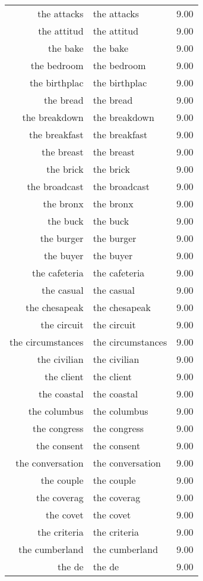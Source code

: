 \begin{table}[ht]
\begin{tabular}{rlr}
  the attacks & the attacks & 9.00 \\ 
  the attitud & the attitud & 9.00 \\ 
  the bake & the bake & 9.00 \\ 
  the bedroom & the bedroom & 9.00 \\ 
  the birthplac & the birthplac & 9.00 \\ 
  the bread & the bread & 9.00 \\ 
  the breakdown & the breakdown & 9.00 \\ 
  the breakfast & the breakfast & 9.00 \\ 
  the breast & the breast & 9.00 \\ 
  the brick & the brick & 9.00 \\ 
  the broadcast & the broadcast & 9.00 \\ 
  the bronx & the bronx & 9.00 \\ 
  the buck & the buck & 9.00 \\ 
  the burger & the burger & 9.00 \\ 
  the buyer & the buyer & 9.00 \\ 
  the cafeteria & the cafeteria & 9.00 \\ 
  the casual & the casual & 9.00 \\ 
  the chesapeak & the chesapeak & 9.00 \\ 
  the circuit & the circuit & 9.00 \\ 
  the circumstances & the circumstances & 9.00 \\ 
  the civilian & the civilian & 9.00 \\ 
  the client & the client & 9.00 \\ 
  the coastal & the coastal & 9.00 \\ 
  the columbus & the columbus & 9.00 \\ 
  the congress & the congress & 9.00 \\ 
  the consent & the consent & 9.00 \\ 
  the conversation & the conversation & 9.00 \\ 
  the couple & the couple & 9.00 \\ 
  the coverag & the coverag & 9.00 \\ 
  the covet & the covet & 9.00 \\ 
  the criteria & the criteria & 9.00 \\ 
  the cumberland & the cumberland & 9.00 \\ 
  the de & the de & 9.00 \\ 

\end{tabular}
\end{table}
